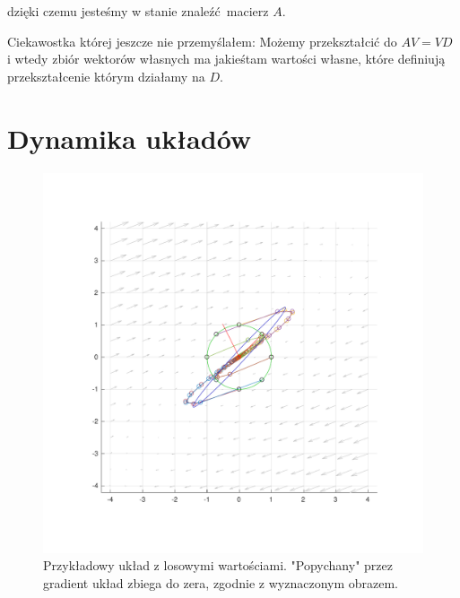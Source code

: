 \documentclass[]{article}
\begin{document}
dzięki czemu jesteśmy w stanie znaleźć macierz $A$.

Ciekawostka której jeszcze nie przemyślałem: Możemy przekształcić do $AV = VD$ i wtedy zbiór wektorów własnych ma jakieśtam wartości własne, które definiują przekształcenie którym działamy na $D$. 

\section{Dynamika układów}
\begin{figure}
	\centering
	\includegraphics[width=0.99\linewidth]{demo}
	\caption{Przykładowy układ z losowymi wartościami. "Popychany" przez gradient układ zbiega do zera, zgodnie z wyznaczonym obrazem.}
	\label{fig:normal0}
\end{figure}
\end{document}
